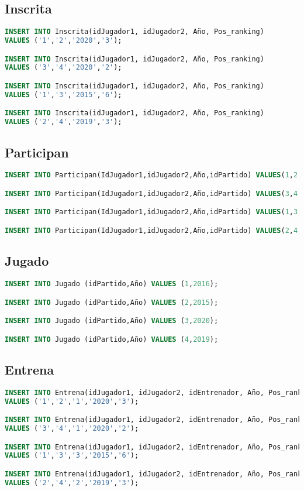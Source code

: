\pagebreak

\subsection{Inscrita}
\begin{lstlisting}[language=sql]
INSERT INTO Inscrita(idJugador1, idJugador2, Año, Pos_ranking)
VALUES ('1','2','2020','3');

INSERT INTO Inscrita(idJugador1, idJugador2, Año, Pos_ranking)
VALUES ('3','4','2020','2');

INSERT INTO Inscrita(idJugador1, idJugador2, Año, Pos_ranking)
VALUES ('1','3','2015','6');

INSERT INTO Inscrita(idJugador1, idJugador2, Año, Pos_ranking)
VALUES ('2','4','2019','3');
\end{lstlisting}

\subsection{Participan}
\begin{lstlisting}[language=sql]
INSERT INTO Participan(IdJugador1,idJugador2,Año,idPartido) VALUES(1,2,2020,2);

INSERT INTO Participan(IdJugador1,idJugador2,Año,idPartido) VALUES(3,4,2020,1);

INSERT INTO Participan(IdJugador1,idJugador2,Año,idPartido) VALUES(1,3,2015,3);

INSERT INTO Participan(IdJugador1,idJugador2,Año,idPartido) VALUES(2,4,2019,4);
\end{lstlisting}

\subsection{Jugado}
\begin{lstlisting}[language=sql]
INSERT INTO Jugado (idPartido,Año) VALUES (1,2016);

INSERT INTO Jugado (idPartido,Año) VALUES (2,2015);

INSERT INTO Jugado (idPartido,Año) VALUES (3,2020);

INSERT INTO Jugado (idPartido,Año) VALUES (4,2019);
\end{lstlisting}

\subsection{Entrena}
\begin{lstlisting}[language=sql]
INSERT INTO Entrena(idJugador1, idJugador2, idEntrenador, Año, Pos_ranking)
VALUES ('1','2','1','2020','3');

INSERT INTO Entrena(idJugador1, idJugador2, idEntrenador, Año, Pos_ranking)
VALUES ('3','4','1','2020','2');

INSERT INTO Entrena(idJugador1, idJugador2, idEntrenador, Año, Pos_ranking)
VALUES ('1','3','3','2015','6');

INSERT INTO Entrena(idJugador1, idJugador2, idEntrenador, Año, Pos_ranking)
VALUES ('2','4','2','2019','3');
\end{lstlisting}

